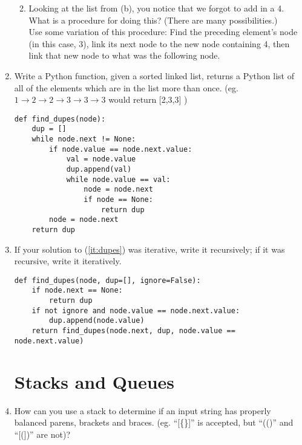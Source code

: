 \documentclass[11pt]{article}
\newenvironment{answer}{\large\lstset{basicstyle=\large}\color{white}}{}
\newenvironment{answer}{\large\lstset{basicstyle=\large}\color{red}}{}
\begin{document}
\begin{enumerate}
\begin{enumerate}
\begin{answer}
				\end{answer}
				\vspace{1in}
            \item Looking at the list from (b), you notice that we forgot to
                  add in a 4. What is a procedure for doing this? (There are
                  many possibilities.) \\
                \begin{answer}
				Use some variation of this procedure: Find the preceding element's node (in this case, 3), link its next node to the new node containing 4, then link that new node to what was the following node.
				\end{answer}
				\vspace{1in}
        \end{enumerate}

		\pagebreak

    \item Write a Python function, given a sorted linked list, returns a Python
    list of all of the elements which are in the list more than once. (eg.
    $1\rightarrow2\rightarrow2\rightarrow3\rightarrow3\rightarrow3$ would return [2,3,3] )
\label{it:dupes}
\begin{answer}
\begin{lstlisting}
def find_dupes(node):
	dup = []
	while node.next != None:
		if node.value == node.next.value:
			val = node.value
			dup.append(val)
			while node.value == val:
				node = node.next
				if node == None:
					return dup
		node = node.next
	return dup
\end{lstlisting}
\end{answer}
        \vspace{1.5in}
    \item If your solution to (\ref{it:dupes}) was iterative, write it recursively; if it
    was recursive, write it iteratively.
\begin{answer}
\begin{lstlisting}
def find_dupes(node, dup=[], ignore=False):
	if node.next == None:
		return dup
	if not ignore and node.value == node.next.value:
		dup.append(node.value)
	return find_dupes(node.next, dup, node.value == node.next.value)
\end{lstlisting}
\end{answer}
        \pagebreak

\section*{Stacks and Queues}
\item How can you use a stack to determine if an input string has properly
      balanced parens, brackets and braces. (eg. ``[\{\}]'' is accepted, but
      ``(()'' and ``[(])'' are not)?


\end{enumerate}
\end{document}
